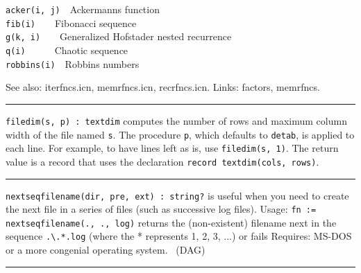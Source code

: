 \texttt{acker(i, j)}\ \ Ackermann{\textquotesingle}s function\\
\texttt{fib(i)}\ \ \ \ Fibonacci sequence\\
\texttt{g(k, i)}\ \ \ \ Generalized Hofstader nested recurrence\\
\texttt{q(i)}\ \ \ \ \ \ {\textquotedbl}Chaotic{\textquotedbl}
sequence\\
\texttt{robbins(i)}\ \ Robbins numbers

See also: iterfncs.icn, memrfncs.icn, recrfncs.icn. Links: factors,
memrfncs. 

\vspace{0.25cm}\hrule{}

\texttt{filedim(s, p) : textdim} computes the number of rows and maximum
column width of the file named \texttt{s}. The procedure \texttt{p},
which defaults to \texttt{detab}, is applied to each line. For example,
to have lines left as is, use \texttt{filedim(s, 1)}. The return value
is a record that uses the declaration \texttt{record textdim(cols,
rows)}. 

\vspace{0.25cm}\hrule{}

\texttt{nextseqfilename(dir, pre, ext) : string?} is useful when you
need to create the next file in a series of files (such as successive
log files). Usage: \texttt{fn :=
nextseqfilename({\textquotedbl}.{\textquotedbl},
{\textquotedbl}.{\textquotedbl}, {\textquotedbl}log{\textquotedbl})}
returns the (non-existent) filename next in the sequence
\texttt{.{\textbackslash}.*.log} (where the * represents 1, 2, 3, ...)
or fails Requires: MS-DOS or a more congenial operating system. \ (DAG)

\vspace{0.25cm}\hrule{}


